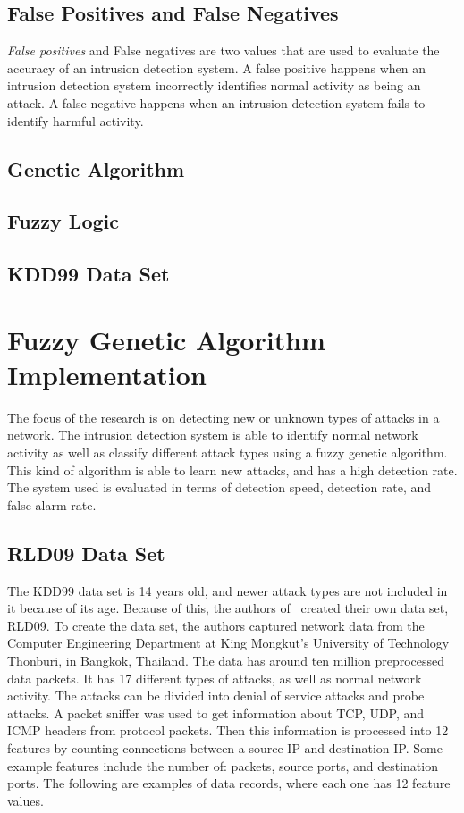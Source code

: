 \documentclass{sig-alternate}
\begin{document}
\subsection{False Positives and False Negatives}
\emph{False positives} and {False negatives} are two values that are used to evaluate the accuracy of an intrusion detection system. A false positive happens when an intrusion detection system incorrectly identifies normal activity as being an attack. A false negative happens when an intrusion detection system fails to identify harmful activity.~\cite{Liao201316}




\subsection{Genetic Algorithm}

\subsection{Fuzzy Logic}

\subsection{KDD99 Data Set}





\section{Fuzzy Genetic Algorithm Implementation}
The focus of the research is on detecting new or unknown types of attacks in a network. The intrusion detection system is able to identify normal network activity as well as classify different attack types using a fuzzy genetic algorithm. This kind of algorithm is able to learn new attacks, and has a high detection rate. The system used is evaluated in terms of detection speed, detection rate, and false alarm rate.




\subsection{RLD09 Data Set}
The KDD99 data set is 14 years old, and newer attack types are not included in it because of its age. Because of this, the authors of~\cite{6496342, 6559603} created their own data set, RLD09. To create the data set, the authors captured network data from the Computer Engineering Department at King Mongkut's University of Technology Thonburi, in Bangkok, Thailand. The data has around ten million preprocessed data packets. It has 17 different types of attacks, as well as normal network activity. The attacks can be divided into denial of service attacks and probe attacks. A packet sniffer was used to get information about TCP, UDP, and ICMP headers from protocol packets. Then this information is processed into 12 features by counting connections between a source IP and destination IP. Some example features include the number of: packets, source ports, and destination ports. The following are examples of data records, where each one has 12 feature values.
\end{document}
